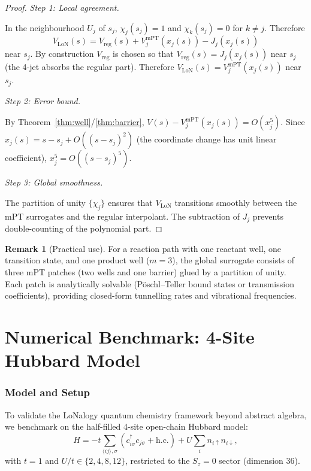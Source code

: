 \documentclass[12pt]{article}
\theoremstyle{plain}
\theoremstyle{definition}
\newtheorem{remark}[theorem]{Remark}
\numberwithin{equation}{section}
\newcommand{\LoN}{\mathrm{LoN}}
\begin{document}
\begin{proof}
\emph{Step 1: Local agreement.}

In the neighbourhood $U_j$ of $s_j$, $\chi_j(s_j)=1$ and
$\chi_k(s_j)=0$ for $k\neq j$.  Therefore
\begin{equation}
V_{\LoN}(s) = V_{\mathrm{reg}}(s)
+ V_j^{\mathrm{mPT}}(x_j(s)) - J_j(x_j(s))
\end{equation}
near $s_j$.  By construction $V_{\mathrm{reg}}$ is chosen so that
$V_{\mathrm{reg}}(s)=J_j(x_j(s))$ near $s_j$ (the 4-jet absorbs
the regular part).  Therefore
$V_{\LoN}(s)=V_j^{\mathrm{mPT}}(x_j(s))$ near $s_j$.

\emph{Step 2: Error bound.}

By Theorem~\ref{thm:well}/\ref{thm:barrier},
$V(s)-V_j^{\mathrm{mPT}}(x_j(s))=O(x_j^5)$.
Since $x_j(s)=s-s_j+O((s-s_j)^2)$ (the coordinate change has
unit linear coefficient), $x_j^5=O((s-s_j)^5)$.

\emph{Step 3: Global smoothness.}

The partition of unity $\{\chi_j\}$ ensures that $V_{\LoN}$
transitions smoothly between the mPT surrogates and the regular
interpolant.  The subtraction of $J_j$ prevents double-counting
of the polynomial part.
\end{proof}

\begin{remark}[Practical use]
For a reaction path with one reactant well, one transition state,
and one product well ($m=3$), the global surrogate consists of
three mPT patches (two wells and one barrier) glued by a partition
of unity.  Each patch is analytically solvable (Pöschl--Teller
bound states or transmission coefficients), providing closed-form
tunnelling rates and vibrational frequencies.
\end{remark}


\part{Numerical Benchmark: 4-Site Hubbard Model}

\section{Model and Setup}\label{sec:hubbard}

To validate the LoNalogy quantum chemistry framework beyond
abstract algebra, we benchmark on the half-filled 4-site
open-chain Hubbard model:
\begin{equation}\label{eq:hubbard}
H = -t\sum_{\langle ij\rangle,\sigma}
(c_{i\sigma}^\dagger c_{j\sigma}+\mathrm{h.c.})
+ U\sum_i n_{i\uparrow}n_{i\downarrow},
\end{equation}
with $t=1$ and $U/t\in\{2,4,8,12\}$, restricted to the $S_z=0$
sector (dimension 36).
\end{document}
